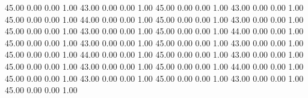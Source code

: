    45.00   0.00   0.00   1.00
   43.00   0.00   0.00   1.00
   45.00   0.00   0.00   1.00
   43.00   0.00   0.00   1.00
   45.00   0.00   0.00   1.00
   44.00   0.00   0.00   1.00
   45.00   0.00   0.00   1.00
   43.00   0.00   0.00   1.00
   45.00   0.00   0.00   1.00
   43.00   0.00   0.00   1.00
   45.00   0.00   0.00   1.00
   44.00   0.00   0.00   1.00
   45.00   0.00   0.00   1.00
   43.00   0.00   0.00   1.00
   45.00   0.00   0.00   1.00
   43.00   0.00   0.00   1.00
   45.00   0.00   0.00   1.00
   44.00   0.00   0.00   1.00
   45.00   0.00   0.00   1.00
   43.00   0.00   0.00   1.00
   45.00   0.00   0.00   1.00
   43.00   0.00   0.00   1.00
   45.00   0.00   0.00   1.00
   44.00   0.00   0.00   1.00
   45.00   0.00   0.00   1.00
   43.00   0.00   0.00   1.00
   45.00   0.00   0.00   1.00
   43.00   0.00   0.00   1.00
   45.00   0.00   0.00   1.00
